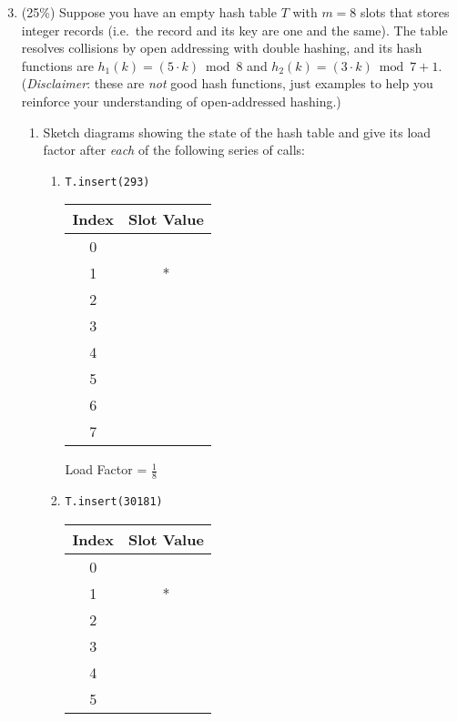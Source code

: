 \documentclass[11pt]{article}
\begin{document}
\begin{enumerate}
\setcounter{enumi}{2}
\item (25\%)
Suppose you have an empty hash table $T$ with $m = 8$ slots that stores
integer records (i.e.\ the record and its key are one and the same).
The table resolves collisions by open addressing with double hashing,
and its hash functions are $h_1(k) = (5 \cdot k) \bmod 8$ and
$h_2(k) = (3 \cdot k) \bmod 7 + 1$.  (\textit{Disclaimer}: these are
\emph{not} good hash functions, just examples to help you reinforce
your understanding of open-addressed hashing.)

\begin{enumerate}
\item

Sketch diagrams showing the state of the hash table and give its load
factor after \emph{each} of the following series of calls:
\begin{enumerate}
\item 
\begin{verbatim}
T.insert(293)
\end{verbatim}
\begin{center}
\begin{tabular}{|c | c|}
\hline
Index & Slot Value\\
\hline
0 & \\
\hline
1 & * \\
\hline
2 & \\
\hline
3 & \\
\hline
4 & \\
\hline
5 & \\
\hline
6 & \\
\hline
7 &  \\
\hline
\end{tabular}
\end{center}
Load Factor = $\frac{1}{8}$
\item
\begin{verbatim}
T.insert(30181)
\end{verbatim}
\begin{center}
\begin{tabular}{|c | c|}
\hline
Index & Slot Value\\
\hline
0 & \\
\hline
1 & * \\
\hline
2 & \\
\hline
3 & \\
\hline
4 & \\
\hline
5 & \\

\end{tabular}
\end{center}
\end{enumerate}
\end{enumerate}
\end{enumerate}
\end{document}
